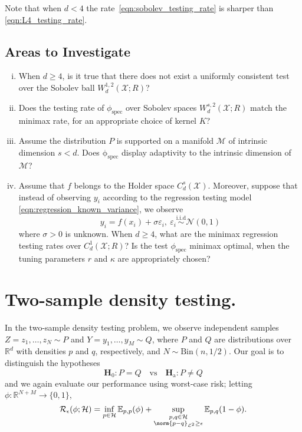 \documentclass{article}
\newcommand{\Reals}{\mathbb{R}}
\newcommand{\1}{\mathbf{1}}
\newcommand{\Leb}{\mathcal{L}}
\newcommand{\Ebb}{\mathbb{E}}
\theoremstyle{alden}
\theoremstyle{aldenthm}
\theoremstyle{definition}
\theoremstyle{remark}
\begin{document}
Note that when $d < 4$ the rate~\eqref{eqn:sobolev_testing_rate} is sharper than \eqref{eqn:L4_testing_rate}. 

\subsection{Areas to Investigate}

\begin{enumerate}[(i)]
	\item When $d \geq 4$, is it true that there does not exist a uniformly consistent
	test over the Sobolev ball $W_d^{1,2}(\mathcal{X};R)$?
	\item Does the testing rate of $\phi_{\mathrm{spec}}$ over Sobolev spaces $W_d^{s,2}(\mathcal{X};R)$ match the minimax rate, for an appropriate choice of kernel $K$?
	\item Assume the distribution $P$ is supported on a manifold $\mathcal{M}$ of intrinsic dimension $s < d$. Does $\mathrm{\phi_{\mathrm{spec}}}$ display adaptivity to the intrinsic dimension of $\mathcal{M}$?
	\item Assume that $f$ belongs to the Holder space $C_d^s(\mathcal{X})$. Moreover, suppose that instead of observing ${y_i}$ according to the regression testing model \eqref{eqn:regression_known_variance}, we observe
	\begin{equation*}
	y_i = f(x_i) + \sigma \varepsilon_i, ~\varepsilon_i \overset{\textrm{i.i.d}}{\sim} \mathcal{N}(0,1)
	\end{equation*}
	where $\sigma > 0$ is unknown. When $d \geq 4$, what are the minimax regression testing rates over $C_d^1(\mathcal{X};R)$? Is the test $\phi_{\mathrm{spec}}$ minimax optimal, when the tuning parameters $r$ and $\kappa$ are appropriately chosen?
\end{enumerate}

\section{Two-sample density testing.}
In the two-sample density testing problem, we observe independent samples $Z = z_1,\ldots,z_N \sim P$ and $Y = y_1,\ldots,y_M \sim Q$, where $P$ and $Q$ are distributions over $\Reals^d$ with densities $p$ and $q$, respectively, and $N \sim \textrm{Bin}(n,1/2)$. Our goal is to distinguish the hypotheses
\begin{equation*}
\mathbf{H}_0: P = Q \quad \textrm{vs} \quad \mathbf{H}_{\textrm{a}}: P \neq Q
\end{equation*}
and we again evaluate our performance using worst-case risk; letting $\phi:\Reals^{N + M} \to \{0,1\}$, 
\begin{equation*}
\mathcal{R}_{\epsilon}(\phi; \mathcal{H}) = \inf_{p \in \mathcal{H}}\Ebb_{p,p}(\phi) + \sup_{\substack{p,q \in \mathcal{H} \\ \norm{p - q}_{\Leb^2} \geq \epsilon}} \Ebb_{p,q}(1 - \phi).
\end{equation*}
\end{document}
